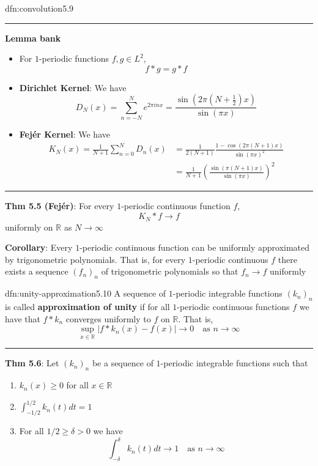 \documentclass[landscape, 8pt]{extarticle}
\begin{document}
\begin{multicols}{3}
\begin{dfn}[Convolution]{dfn:convolution}{5.9}
	\noindent\rule{\textwidth}{0.2pt}
	\textbf{Lemma bank}
	\begin{itemize}
	    \setlength\itemsep{0em}
	    \item[\textbf{5.2}] For $1$-periodic functions $f, g\in L^{2}$,
			\[f * g = g * f\]
		\item[\textbf{5.3}] \textbf{Dirichlet Kernel}: We have
			\[D_{N}(x) = \sum_{n = -N}^{N} e^{2 \pi inx} = \frac{\sin(2 \pi(N + \frac{1}{2})x)}{\sin( \pi x)}\]
		\item[\textbf{5.4}] \textbf{Fejér Kernel}:  We have
			\begin{align*}
				K_{N}(x) = \frac{1}{N+1} \sum_{n = 0}^{N} D_{n}(x) &= \frac{1}{2(N+1)} \frac{1 - \cos(2\pi(N + 1)x)}{\sin(\pi x)^{2}}\\
						 &= \frac{1}{N+1} \left( \frac{\sin(\pi(N + 1) x)}{\sin(\pi x)}\right)^{2}
			\end{align*}
	\end{itemize}
	\noindent\rule{\textwidth}{0.2pt}
	\textbf{Thm 5.5 (Fejér)}: For every $1$-periodic continuous function $f$,
	\[K_{N} * f \to f\]
	uniformly on $\mathbb{R}$ as $N\to\infty$

	\textbf{Corollary}: Every $1$-periodic continuous function can be uniformly approximated by trigonometric polynomials. That is, for every $1$-periodic continuous $f$ there exists a sequence $(f_{n})_{n}$ of trigonometric polynomials so that $f_{n} \to f$ uniformly

\end{dfn}

\newpage
\begin{dfn}{dfn:unity-approximation}{5.10}
	A sequence of $1$-periodic integrable functions $(k_{n})_{n}$ is called \textbf{approximation of unity} if for all $1$-periodic continuous functions $f$ we have that $f * k_{n}$ converges uniformly to $f$ on $\mathbb{R}$. That is,
	\[\sup_{x\in\mathbb{R}} \lvert f * k_{n}(x) - f(x) \rvert \to 0 \quad \text{as $n\to\infty$}\]

	\noindent\rule{\textwidth}{0.2pt}
	\textbf{Thm 5.6}: Let $(k_{n})_{n}$ be a sequence of $1$-periodic integrable functions such that
	\begin{enumerate}
	    \item $k_{n}(x) \ge 0$ for all $x\in\mathbb{R}$
	    \item $\int_{-1 /2}^{1 /2} k_{n}(t) dt = 1$
	    \item For all $1 /2 \ge \delta > 0$ we have
			\[\int_{-\delta}^{\delta} k_{n}(t) dt \to 1 \quad\text{as $n\to\infty$}\]
	\end{enumerate}


\end{dfn}
\end{multicols}
\end{document}
